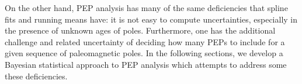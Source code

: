 \documentclass[11pt,letterpaper]{article}
\begin{document}
On the other hand, PEP analysis has many of the same
deficiencies that spline fits and running means have: it is not easy to compute
uncertainties, especially in the presence of unknown ages of poles.
Furthermore, one has the additional challenge and related uncertainty of deciding how many PEPs to
include for a given sequence of paleomagnetic poles.
In the following sections, we develop a Bayesian statistical approach to
PEP analysis which attempts to address some these deficiencies.


\clearpage
\newpage
\footnotesize

\singlespacing



\end{document}
